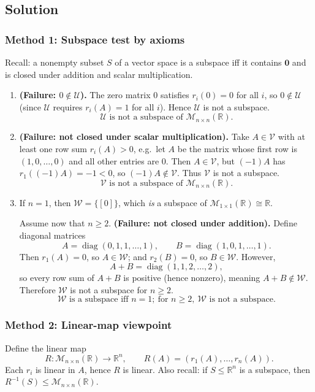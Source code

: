 \documentclass[12pt]{article}
\begin{document}
\subsection{Solution}

\subsubsection{Method 1: Subspace test by axioms}
Recall: a nonempty subset $S$ of a vector space is a subspace iff it contains $\mathbf{0}$ and is closed under addition and scalar multiplication.

\begin{enumerate}[label=(\alph*)]
\item \textbf{(Failure: $0\notin \mathcal{U}$).}
The zero matrix $0$ satisfies $r_i(0)=0$ for all $i$, so $0\notin\mathcal{U}$ (since $\mathcal{U}$ requires $r_i(A)=1$ for all $i$). Hence $\mathcal{U}$ is not a subspace.
\[
\boxed{\,\mathcal{U}\text{ is not a subspace of }\mathcal{M}_{n\times n}(\mathbb{R}).\,}
\]

\item \textbf{(Failure: not closed under scalar multiplication).}
Take $A\in\mathcal{V}$ with at least one row sum $r_i(A)>0$, e.g.\ let $A$ be the matrix whose first row is $(1,0,\ldots,0)$ and all other entries are $0$. Then $A\in\mathcal{V}$, but $(-1)A$ has $r_1((-1)A)=-1<0$, so $(-1)A\notin\mathcal{V}$. Thus $\mathcal{V}$ is not a subspace.
\[
\boxed{\,\mathcal{V}\text{ is not a subspace of }\mathcal{M}_{n\times n}(\mathbb{R}).\,}
\]

\item If $n=1$, then $\mathcal{W}=\{[0]\}$, which \emph{is} a subspace of $\mathcal{M}_{1\times 1}(\mathbb{R})\cong \mathbb{R}$.

Assume now that $n\ge 2$. \textbf{(Failure: not closed under addition).}
Define diagonal matrices
\[
A=\operatorname{diag}(0,1,1,\ldots,1),\qquad B=\operatorname{diag}(1,0,1,\ldots,1).
\]
Then $r_1(A)=0$, so $A\in\mathcal{W}$; and $r_2(B)=0$, so $B\in\mathcal{W}$. However,
\[
A+B=\operatorname{diag}(1,1,2,\ldots,2),
\]
so every row sum of $A+B$ is positive (hence nonzero), meaning $A+B\notin\mathcal{W}$. Therefore $\mathcal{W}$ is not a subspace for $n\ge 2$.
\[
\boxed{\,\mathcal{W}\text{ is a subspace iff }n=1;\ \text{for }n\ge 2,\ \mathcal{W}\text{ is not a subspace.}\,}
\]
\end{enumerate}

\subsubsection{Method 2: Linear-map viewpoint}
Define the linear map
\[
R:\mathcal{M}_{n\times n}(\mathbb{R})\to \mathbb{R}^n,\qquad R(A)=(r_1(A),\ldots,r_n(A)).
\]
Each $r_i$ is linear in $A$, hence $R$ is linear. Also recall: if $S\le \mathbb{R}^n$ is a subspace, then $R^{-1}(S)\le \mathcal{M}_{n\times n}(\mathbb{R})$.
\end{document}
